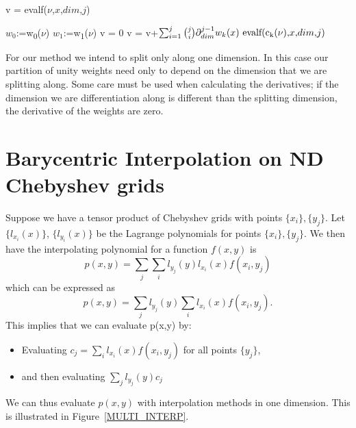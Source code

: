 \documentclass{article}
\newcommand{\child}[1]{c\textsubscript{#1}}
\newcommand{\weight}[1]{w\textsubscript{#1}}
\begin{document}
\begin{algorithm}[!h]
\caption{v = evalf($\nu$,$x$,$dim$,$j$)}
\label{alg7}
\begin{algorithmic}
\STATE $w_0$:=\weight{0}($\nu$)
\STATE $w_1$:=\weight{1}($\nu$)
\STATE v = 0
\STATE v = v+$\sum_{i=1}^j \binom{j}{i} \partial_{dim}^{j-1} w_k(x) \text{ evalf(\child{k}($\nu$),$x$,$dim$,$j$)}$
\ENDFOR
\end{algorithmic}
\end{algorithm}

For our method we intend to split only along one dimension. In this case our partition of unity weights need only to depend on the dimension that we are splitting along. Some care must be used when calculating the derivatives; if the dimension we are differentiation along is different than the splitting dimension, the derivative of the weights are zero.

\section{Barycentric Interpolation on ND Chebyshev grids}

Suppose we have a tensor product of Chebyshev grids with points $\{x_i\},\{y_j\}$. Let $\{l_{x_i}(x)\}$, $\{l_{y_i}(x)\}$ be the Lagrange polynomials for points $\{x_i\},\{y_j\}$. We then have the interpolating polynomial for a function $f(x,y)$ is
\begin{equation}
p(x,y) = \sum_j \sum_i l_{y_j}(y) l_{x_i}(x) f(x_i,y_j)
\end{equation}
which can be expressed as
\begin{equation}
p(x,y) = \sum_j l_{y_j}(y) \sum_i l_{x_i}(x) f(x_i,y_j).
\end{equation}
This implies that we can evaluate p(x,y) by:
\begin{itemize}
\item Evaluating $c_j = \sum_i l_{x_i}(x) f(x_i,y_j)$ for all points $\{y_j\}$,
\item and then evaluating $\sum_j l_{y_j}(y) c_j$
\end{itemize}
We can thus evaluate $p(x,y)$ with interpolation methods in one dimension. This is illustrated in Figure~\ref{MULTI_INTERP}.
\end{document}
